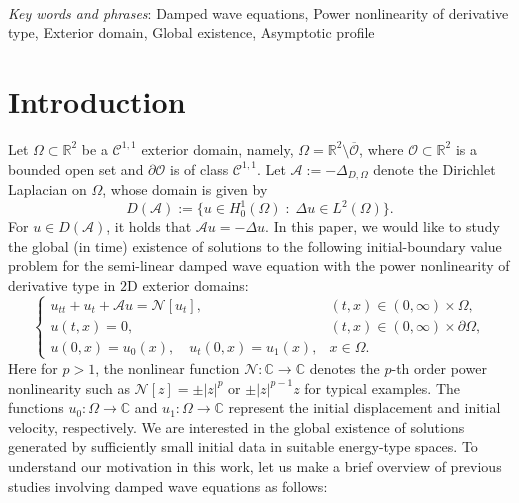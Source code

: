 \documentclass[a4paper,11pt]{article} %
\theoremstyle{remark}
\theoremstyle{definition}
\numberwithin{equation}{section}
\begin{document}
\\
{\footnotesize{\it Key words and phrases}\/: %
Damped wave equations, Power nonlinearity of derivative type, Exterior domain, Global existence, Asymptotic profile
}
\tableofcontents


\section{Introduction}

Let $\Omega\subset\mathbb{R}^2$ be a $\mathcal{C}^{1,1}$ exterior domain, namely, $\Omega=\mathbb{R}^2\setminus \overline{\mathcal{O}}$, where $\mathcal{O}\subset\mathbb{R}^2$ is a bounded open set and $\partial \mathcal{O}$ is of class $\mathcal{C}^{1,1}$. Let $\mathcal{A}:=-\Delta_{D,\Omega}$ denote the Dirichlet Laplacian on $\Omega$, whose domain is given by
\[
D(\mathcal{A})
:=
\{
u\in H^1_0(\Omega)
\;:\;
\Delta u\in L^2(\Omega)
\}.
\]
For $u\in D(\mathcal{A})$, it holds that $\mathcal{A}u=-\Delta u$. In this paper, we would like to study the global (in time) existence of solutions to the following initial-boundary value problem for the semi-linear damped wave equation with the power nonlinearity of derivative type in $2$D exterior domains:
\begin{equation}\label{eq:main}
\begin{cases}
u_{tt}+u_t+ \mathcal{A}u= \mathcal{N}[u_t], & (t,x)\in(0,\infty)\times\Omega,\\
u(t,x)=0, &(t,x)\in(0,\infty)\times \partial\Omega, \\
u(0,x)=u_0(x),\quad u_t(0,x)=u_1(x), & x\in \Omega.
\end{cases}
\end{equation}
Here for $p>1$, the nonlinear function $\mathcal{N}:\mathbb{C}\rightarrow\mathbb{C}$ denotes the $p$-th order power nonlinearity such as $\mathcal{N}[z]=\pm |z|^p$ or $\pm |z|^{p-1}z$ for typical examples. The functions
$u_0:\Omega\to\mathbb C$ and $u_1:\Omega\to\mathbb C$
represent the initial displacement and initial velocity, respectively. We are interested in the global existence of solutions generated by sufficiently small initial data in suitable energy-type spaces. To understand our motivation in this work, let us make a brief overview of previous studies involving damped wave equations as follows:
\end{document}
